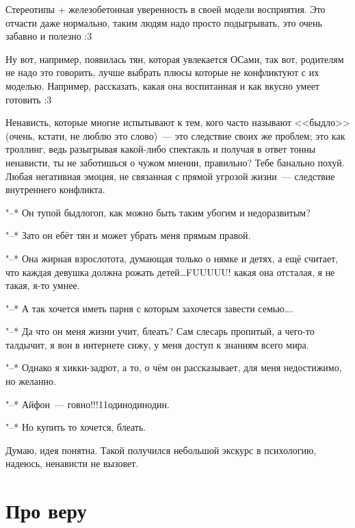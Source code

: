 \documentclass[a4paper,14pt,oneside]{memoir}
\begin{document}
Стереотипы + железобетонная уверенность в своей модели восприятия. Это отчасти даже нормально, таким людям надо просто подыгрывать, это очень забавно и полезно :3 

Ну вот, например, появилась тян, которая увлекается ОСами, так вот, родителям не надо это говорить, лучше выбрать плюсы которые не конфликтуют с их моделью. Например, рассказать, какая она воспитанная и как вкусно умеет готовить :3 

Ненависть, которые многие испытывают к тем, кого часто называют <<быдло>> (очень, кстати, не люблю это слово)~--- это следствие своих же проблем; это как троллинг, ведь разыгрывая какой-либо спектакль и получая в ответ тонны ненависти, ты не заботишься о чужом мнении, правильно? Тебе банально похуй. Любая негативная эмоция, не связанная с прямой угрозой жизни~--- следствие внутреннего конфликта. 

\medskip

"--* Он тупой быдлогоп, как можно быть таким убогим и недоразвитым? 

"--* Зато он ебёт тян и может убрать меня прямым правой.

\medskip

"--* Она жирная взрослотота, думающая только о нямке и детях, а ещё считает, что каждая девушка должна рожать детей\ldots FUUUUU! какая она отсталая, я не такая, я-то умнее.

"--* А так хочется иметь парня с которым захочется завести семью\ldots. %

\medskip

"--* Да что он меня жизни учит, блеать? Сам слесарь пропитый, а чего-то талдычит, я вон в интернете сижу, у меня доступ к знаниям всего мира.

"--* Однако я хикки-задрот, а то, о чём он рассказывает, для меня недостижимо, но желанно.

\medskip

"--* Айфон~--- говно!!!11одинодинодин. 

"--* Но купить то хочется, блеать. 

\medskip

Думаю, идея понятна. Такой получился небольшой экскурс в психологию, надеюсь, ненависти не вызовет. %




\section{Про веру} 
\end{document}
